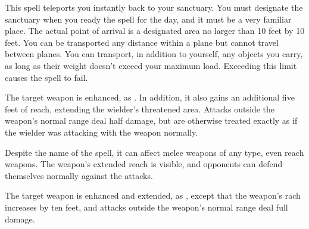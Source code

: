 \begin{spellheader}
\end{spellheader}
\begin{spelleffects}
    \spelleffect This spell teleports you instantly back to your sanctuary. You must designate the sanctuary when you ready the spell for the day, and it must be a very familiar place. The actual point of arrival is a designated area no larger than 10 feet by 10 feet. You can be transported any distance within a plane but cannot travel between planes. You can transport, in addition to yourself, any objects you carry, as long as their weight doesn't exceed your maximum load. Exceeding this limit causes the spell to fail.
\end{spelleffects}
\begin{spellfooter}

\end{spellfooter}

\begin{spellheader}
    \spelldur{\durshort}
\end{spellheader}
\begin{spelleffects}
    \spelleffect The target weapon is enhanced, as . In addition, it also gains an additional five feet of reach, extending the wielder's threatened area. Attacks outside the weapon's normal range deal half damage, but are otherwise treated exactly as if the wielder was attacking with the weapon normally.
\end{spelleffects}
\begin{spellfooter}
    \spellnotes Despite the name of the spell, it can affect melee weapons of any type, even reach weapons. The weapon's extended reach is visible, and opponents can defend themselves normally against the attacks.
\end{spellfooter}

\begin{spellheader}
    \spelldur{\durshort}
\end{spellheader}
\begin{spelleffects}
    \spelleffect The target weapon is enhanced and extended, as , except that the weapon's rach increases by ten feet, and attacks outside the weapon's normal range deal full damage.
\end{spelleffects}
\begin{spellfooter}
\end{spellfooter}
